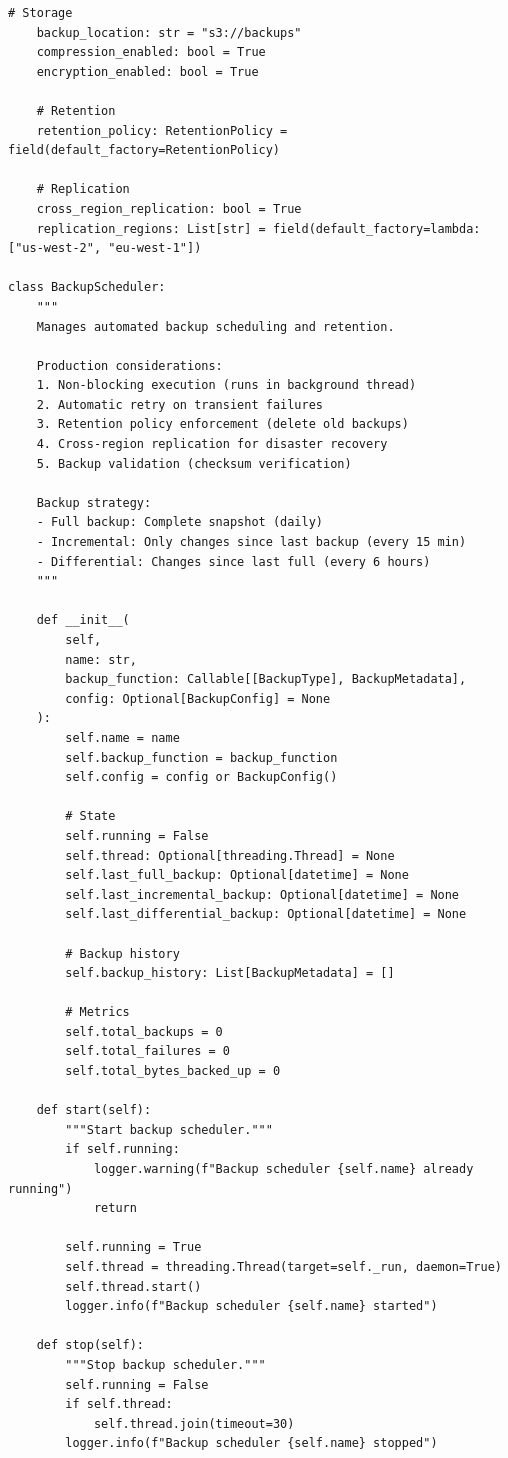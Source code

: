 \begin{lstlisting}[style=python, caption={Backup Scheduler with Retention Policies}]
    # Storage
    backup_location: str = "s3://backups"
    compression_enabled: bool = True
    encryption_enabled: bool = True

    # Retention
    retention_policy: RetentionPolicy = field(default_factory=RetentionPolicy)

    # Replication
    cross_region_replication: bool = True
    replication_regions: List[str] = field(default_factory=lambda: ["us-west-2", "eu-west-1"])

class BackupScheduler:
    """
    Manages automated backup scheduling and retention.

    Production considerations:
    1. Non-blocking execution (runs in background thread)
    2. Automatic retry on transient failures
    3. Retention policy enforcement (delete old backups)
    4. Cross-region replication for disaster recovery
    5. Backup validation (checksum verification)

    Backup strategy:
    - Full backup: Complete snapshot (daily)
    - Incremental: Only changes since last backup (every 15 min)
    - Differential: Changes since last full (every 6 hours)
    """

    def __init__(
        self,
        name: str,
        backup_function: Callable[[BackupType], BackupMetadata],
        config: Optional[BackupConfig] = None
    ):
        self.name = name
        self.backup_function = backup_function
        self.config = config or BackupConfig()

        # State
        self.running = False
        self.thread: Optional[threading.Thread] = None
        self.last_full_backup: Optional[datetime] = None
        self.last_incremental_backup: Optional[datetime] = None
        self.last_differential_backup: Optional[datetime] = None

        # Backup history
        self.backup_history: List[BackupMetadata] = []

        # Metrics
        self.total_backups = 0
        self.total_failures = 0
        self.total_bytes_backed_up = 0

    def start(self):
        """Start backup scheduler."""
        if self.running:
            logger.warning(f"Backup scheduler {self.name} already running")
            return

        self.running = True
        self.thread = threading.Thread(target=self._run, daemon=True)
        self.thread.start()
        logger.info(f"Backup scheduler {self.name} started")

    def stop(self):
        """Stop backup scheduler."""
        self.running = False
        if self.thread:
            self.thread.join(timeout=30)
        logger.info(f"Backup scheduler {self.name} stopped")


\end{lstlisting}
